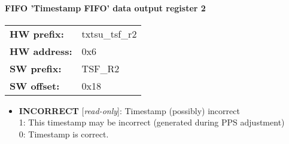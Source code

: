 \paragraph*{FIFO 'Timestamp FIFO' data output register 2}\vspace{12pt}

\begin{tabular}{l l }
{\bf HW prefix:}  & txtsu\_tsf\_r2\\
{\bf HW address:}  & 0x6\\
{\bf SW prefix:}  & TSF\_R2\\
{\bf SW offset:}  & 0x18\\
\end{tabular}


\vspace{12pt}
\noindent
{}

\begin{itemize}
\item \begin{small}
{\bf 
INCORRECT
} [\emph{read-only}]: Timestamp (possibly) incorrect
\\
1: This timestamp may be incorrect (generated during PPS adjustment)\\         0: Timestamp is correct.
\end{small}
\end{itemize}
